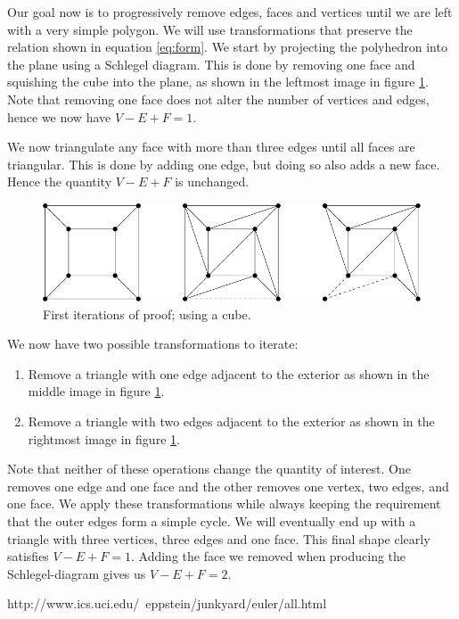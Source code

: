 \documentclass{amsart}
\theoremstyle{plain}
\theoremstyle{definition}
\begin{document}
Our goal now is to progressively remove edges, faces and vertices until we are
left with a very simple polygon. We will use transformations that preserve the
relation shown in equation \ref{eq:form}. We start by projecting the polyhedron
into the plane using a Schlegel diagram. This is done by removing one face and
squishing the cube into the plane, as shown in the leftmost image in figure
\ref{fig:proof}. Note that removing one face does not alter the number of
vertices and edges, hence we now have $V - E + F = 1$.

We now triangulate any face with more than three edges until all faces are
triangular. This is done by adding one edge, but doing so also adds a new face.
Hence the quantity $V - E + F$ is unchanged.

\begin{figure}[ht!]
    \centering
    \includegraphics{drawing.pdf}
    \caption{First iterations of proof; using a cube.}
    \label{fig:proof}
\end{figure}

We now have two possible transformations to iterate: 
\begin{enumerate}
    \item Remove a triangle with one edge adjacent to the exterior as shown in
        the middle image in figure \ref{fig:proof}.  
    \item Remove a triangle
        with two edges adjacent to the exterior as shown in the rightmost image
        in figure \ref{fig:proof}.
\end{enumerate}
Note that neither of these operations change the quantity of interest. One
removes one edge and one face and the other removes one vertex, two edges, and
one face. We apply these transformations while always keeping the requirement
that the outer edges form a simple cycle. We will eventually end up with a
triangle with three vertices, three edges and one face. This final shape
clearly satisfies ${V - E + F = 1}$.  Adding the face we removed when producing
the Schlegel-diagram gives us ${V - E + F = 2}$.

\begin{thebibliography}{9}
        http://www.ics.uci.edu/~eppstein/junkyard/euler/all.html
\end{thebibliography}
\end{document}
